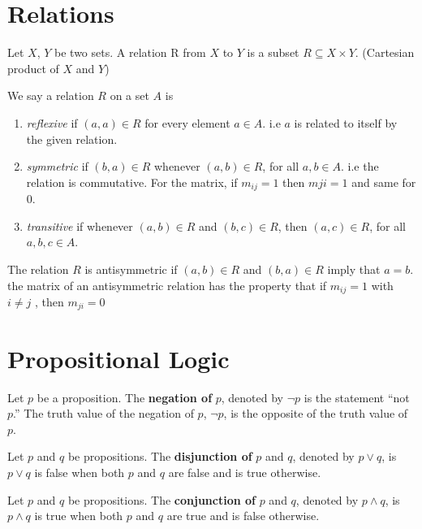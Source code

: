 \documentclass{article}
\begin{document}
\section{Relations}
\begin{definition}
    Let \( X \), \( Y \) be two sets. A relation R from \( X \) to \( Y \) is a subset \( R \subseteq X \times Y \). (Cartesian product of \( X \) and \( Y \))
\end{definition}
\begin{definition}
    We say a relation \( R \) on a set \( A \) is
    \begin{enumerate}
        \item \textit{reflexive} if \( (a, a) \in R \) for every element \( a \in A \). i.e \( a \) is related to itself by the given relation.
        \item \textit{symmetric} if \( (b, a) \in R \) whenever \( (a, b) \in R \), for all \( a, b \in A \). i.e the relation is commutative. For the matrix, if \( m_{ij} = 1\) then \(m{ji} = 1\) and same for 0.
        \item \textit{transitive} if whenever \( (a, b) \in R \) and \( (b, c) \in R \), then \( (a, c) \in R \), for all \( a, b, c \in A \).
    \end{enumerate}
\end{definition}
\begin{definition}
    The relation \( R \) is antisymmetric if \( (a, b) \in R \) and \( (b, a) \in R \) imply that \( a = b \). 
    the matrix of an antisymmetric relation has the property that if \( m_{ij} = 1 \) with \(i \neq j\) , then \( m_{ji} = 0 \)

\end{definition}

\section{Propositional Logic}
\begin{definition}
    Let \( p \) be a proposition. The \textbf{negation of} \( p \), denoted by \( \neg p \) is the statement ``not \( p \).''
    The truth value of the negation of \( p \), \( \neg p \), is the opposite of the truth value of \( p \).
\end{definition}
\begin{definition}
    Let \( p \) and \( q \) be propositions. The \textbf{disjunction of} \( p \) and \( q \), denoted by \( p \lor q \), is \( p \lor q \) is false when both \( p \) and \( q \) are false and is true otherwise.
\end{definition}
\begin{definition}
    Let \( p \) and \( q \) be propositions. The \textbf{conjunction of} \( p \) and \( q \), denoted by \( p \land q \), is \( p \land q \) is true when both \( p \) and \( q \) are true and is false otherwise.
\end{definition}
\end{document}
